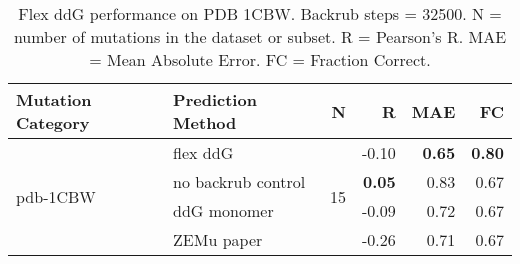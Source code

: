 \begin{table}
  \begin{tabular}{llrrrr}
\toprule
Mutation Category &   Prediction Method &   N &     R &  MAE &   FC \\
\midrule
 \multirow{ 4}{*}{pdb-1CBW} & flex ddG & \multirow{ 4}{*}{15} & -0.10 & \textbf{0.65} & \textbf{0.80}  \\
 & no backrub control & & \textbf{0.05} & 0.83 & 0.67  \\
 & ddG monomer & & -0.09 & 0.72 & 0.67  \\
 & ZEMu paper & & -0.26 & 0.71 & 0.67  \\
\bottomrule
\end{tabular}
  \caption[Flex ddG performance on PDB 1CBW]{
    Flex ddG performance on PDB 1CBW. Backrub steps = 32500. N = number of mutations in the dataset or subset. R = Pearson's R. MAE = Mean Absolute Error. FC = Fraction Correct.
  } \label{tab:table-pdb-1CBW}
\end{table}
